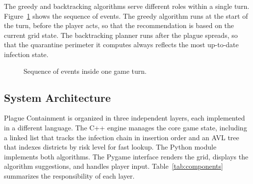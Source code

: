 \documentclass[12pt, a4paper]{article}
\begin{document}
The greedy and backtracking algorithms serve different roles within a single
turn. Figure~\ref{fig:loop} shows the sequence of events. The greedy
algorithm runs at the start of the turn, before the player acts, so that
the recommendation is based on the current grid state. The backtracking
planner runs after the plague spreads, so that the quarantine perimeter
it computes always reflects the most up-to-date infection state.

\begin{figure}[H]
\centering
{}
\caption{Sequence of events inside one game turn.}
\label{fig:loop}
\end{figure}

\subsection{System Architecture}

Plague Containment is organized in three independent layers, each
implemented in a different language. The C++ engine manages the core game
state, including a linked list that tracks the infection chain in insertion
order and an AVL tree that indexes districts by risk level for fast lookup.
The Python module implements both algorithms. The Pygame interface renders
the grid, displays the algorithm suggestions, and handles player input.
Table~\ref{tab:components} summarizes the responsibility of each layer.
\end{document}
